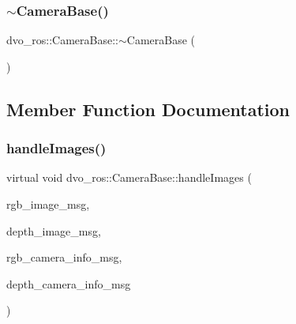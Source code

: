 \mbox{\label{classdvo__ros_1_1_camera_base_a022e9f3ea3010cf84bad64fa63f8e1b0}} 
\subsubsection{\texorpdfstring{$\sim$\+Camera\+Base()}{~CameraBase()}}
{\footnotesize\ttfamily dvo\+\_\+ros\+::\+Camera\+Base\+::$\sim$\+Camera\+Base (\begin{DoxyParamCaption}{ }\end{DoxyParamCaption})\hspace{0.3cm}{\ttfamily [virtual]}}



\subsection{Member Function Documentation}
\mbox{\label{classdvo__ros_1_1_camera_base_aa8c983ab1bb8383aae1f375ea6808120}} 
\subsubsection{\texorpdfstring{handle\+Images()}{handleImages()}}
{\footnotesize\ttfamily virtual void dvo\+\_\+ros\+::\+Camera\+Base\+::handle\+Images (\begin{DoxyParamCaption}\item[{const sensor\+\_\+msgs\+::\+Image\+::\+Const\+Ptr \&}]{rgb\+\_\+image\+\_\+msg,  }\item[{const sensor\+\_\+msgs\+::\+Image\+::\+Const\+Ptr \&}]{depth\+\_\+image\+\_\+msg,  }\item[{const sensor\+\_\+msgs\+::\+Camera\+Info\+::\+Const\+Ptr \&}]{rgb\+\_\+camera\+\_\+info\+\_\+msg,  }\item[{const sensor\+\_\+msgs\+::\+Camera\+Info\+::\+Const\+Ptr \&}]{depth\+\_\+camera\+\_\+info\+\_\+msg }\end{DoxyParamCaption})\hspace{0.3cm}{\ttfamily [pure virtual]}}



